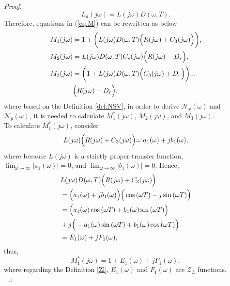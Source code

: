\begin{proof}
\begin{equation}
\label{Ld}
    L_d(j\omega)=L(j\omega)D(\omega,T).
\end{equation}
Therefore, equations in (\ref{eq.M}) can be rewritten as below
\begin{equation}
    \begin{split}
        M_1(j\omega)&=1+\bigg(L(j\omega) D(\omega,T)\Bigl(R(j\omega)+C_3(j\omega)\Bigl)\bigg), \\
        M_2(j\omega)&=L(j\omega) D(\omega,T)C_s(j\omega)\Big(R(j\omega)-D_r\Big), \\
        M_3(j\omega)&=\bigg(1+L(j\omega) D(\omega,T)\Big(C_3(j\omega)+D_r\Big)\bigg)...\\
        &\Bigl(R(j\omega)-D_r\Bigl),
    \end{split}
    \label{eq.M new}
\end{equation}
where based on the Definition \ref{def:NSV}, in order to derive $\mathcal{N}_x (\omega)$ and $\mathcal{N}_y (\omega)$, it is needed to calculate $M_1^*(j\omega)$, $M_2(j\omega)$, and $M_3(j\omega)$.\\
To calculate $M_1^*(j\omega)$, consider
\begin{equation}
\label{eq: a1b1}
    L(j\omega)\Bigl(R(j\omega)+C_3(j\omega)\Bigl)=a_1(\omega)+jb_1(\omega),
\end{equation}
where because $L(j\omega)$ is a strictly proper transfer function, $\lim_{\omega\to\infty} |a_1(\omega)|=0$, and $\lim_{\omega\to\infty} |b_1(\omega)|=0$. Hence,
\begin{equation}
\begin{split}
\label{eq: E1E2}
    &L(j\omega)D(\omega,T)\Bigl(R(j\omega)+C_3(j\omega)\Bigl)\\
    &=\Big(a_1(\omega)+jb_1(\omega)\Big)\Big(\cos{(\omega T)}-j\sin{(\omega T)}\Big) \\
    &=\Big(a_1(\omega)\cos{(\omega T)}+b_1(\omega)\sin{(\omega T)}\Big)\\
    &+j\Big(-a_1(\omega)\sin{(\omega T)}+b_1(\omega)\cos{(\omega T)}\Big)\\
    &=E_1(\omega)+jF_1(\omega),
    \end{split}
\end{equation}
thus,
\begin{equation}
    \label{eq: M1*}
    M_1^{*}(j\omega)=1+E_1(\omega)+jF_1(\omega),
\end{equation}
where regarding the Definition \ref{Zl}, $E_1(\omega)$ and $F_1(\omega)$ are $\mathcal{Z}_L$ functions.\\

\end{proof}
